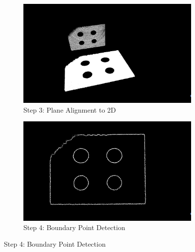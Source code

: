 \documentclass[english, bachelor, utf8]{base/thesis_telematics}
\begin{document}
\begin{figure}[htbp]
    \begin{subfigure}[b]{0.45\textwidth}
        \centering
        \includegraphics[width=\linewidth]{pics/calib_pics/aligned.png}
        \caption{Step 3: Plane Alignment to 2D}
    \end{subfigure}
    \hfill
    \begin{subfigure}[b]{0.45\textwidth}
        \centering
        \includegraphics[width=\linewidth]{pics/calib_pics/edge.png}
        \caption{Step 4: Boundary Point Detection}
    \end{subfigure}


\end{figure}
\end{document}
